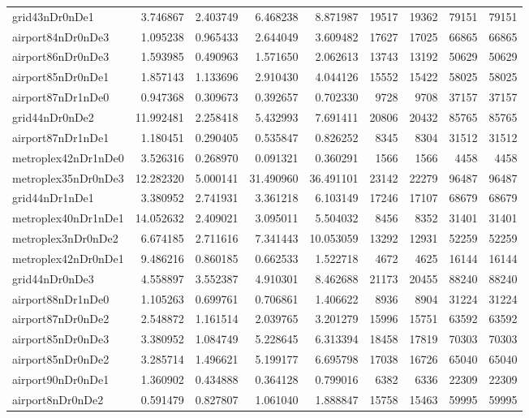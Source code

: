 \begin{longtable}{|l|r|r|r|r|r|r|r|r|}
grid43nDr0nDe1 & 3.746867 & 2.403749 & 6.468238 & 8.871987 & 19517 & 19362 & 79151 & 79151 \\
airport84nDr0nDe3 & 1.095238 & 0.965433 & 2.644049 & 3.609482 & 17627 & 17025 & 66865 & 66865 \\
airport86nDr0nDe3 & 1.593985 & 0.490963 & 1.571650 & 2.062613 & 13743 & 13192 & 50629 & 50629 \\
airport85nDr0nDe1 & 1.857143 & 1.133696 & 2.910430 & 4.044126 & 15552 & 15422 & 58025 & 58025 \\
airport87nDr1nDe0 & 0.947368 & 0.309673 & 0.392657 & 0.702330 & 9728 & 9708 & 37157 & 37157 \\
grid44nDr0nDe2 & 11.992481 & 2.258418 & 5.432993 & 7.691411 & 20806 & 20432 & 85765 & 85765 \\
airport87nDr1nDe1 & 1.180451 & 0.290405 & 0.535847 & 0.826252 & 8345 & 8304 & 31512 & 31512 \\
metroplex42nDr1nDe0 & 3.526316 & 0.268970 & 0.091321 & 0.360291 & 1566 & 1566 & 4458 & 4458 \\
metroplex35nDr0nDe3 & 12.282320 & 5.000141 & 31.490960 & 36.491101 & 23142 & 22279 & 96487 & 96487 \\
grid44nDr1nDe1 & 3.380952 & 2.741931 & 3.361218 & 6.103149 & 17246 & 17107 & 68679 & 68679 \\
metroplex40nDr1nDe1 & 14.052632 & 2.409021 & 3.095011 & 5.504032 & 8456 & 8352 & 31401 & 31401 \\
metroplex3nDr0nDe2 & 6.674185 & 2.711616 & 7.341443 & 10.053059 & 13292 & 12931 & 52259 & 52259 \\
metroplex42nDr0nDe1 & 9.486216 & 0.860185 & 0.662533 & 1.522718 & 4672 & 4625 & 16144 & 16144 \\
grid44nDr0nDe3 & 4.558897 & 3.552387 & 4.910301 & 8.462688 & 21173 & 20455 & 88240 & 88240 \\
airport88nDr1nDe0 & 1.105263 & 0.699761 & 0.706861 & 1.406622 & 8936 & 8904 & 31224 & 31224 \\
airport87nDr0nDe2 & 2.548872 & 1.161514 & 2.039765 & 3.201279 & 15996 & 15751 & 63592 & 63592 \\
airport85nDr0nDe3 & 3.380952 & 1.084749 & 5.228645 & 6.313394 & 18458 & 17819 & 70303 & 70303 \\
airport85nDr0nDe2 & 3.285714 & 1.496621 & 5.199177 & 6.695798 & 17038 & 16726 & 65040 & 65040 \\
airport90nDr0nDe1 & 1.360902 & 0.434888 & 0.364128 & 0.799016 & 6382 & 6336 & 22309 & 22309 \\
airport8nDr0nDe2 & 0.591479 & 0.827807 & 1.061040 & 1.888847 & 15758 & 15463 & 59995 & 59995 \\

\end{longtable}
